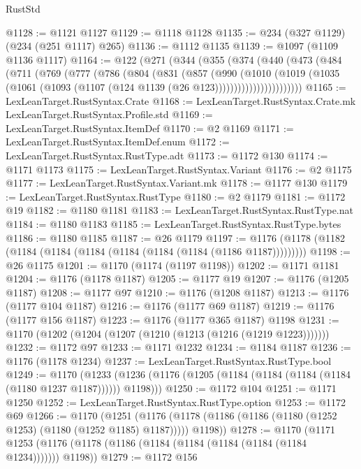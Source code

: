 \begin{lexlean}{RustStd}
\begin{coremodule}
@1128 := @1121 @1127
@1129 := @1118 @1128
@1135 := @234 (@327 @1129) (@234 (@251 @1117) @265)
@1136 := @1112 @1135
@1139 := @1097 (@1109 @1136 @1117)
@1164 := @122
    (@271
      (@344
        (@355
          (@374
            (@440
              (@473
                (@484
                  (@711
                    (@769
                      (@777
                        (@786
                          (@804
                            (@831
                              (@857
                                (@990
                                  (@1010
                                    (@1019
                                      (@1035
                                        (@1061
                                          (@1093 (@1107 (@124 @1139 (@26 @123)))))))))))))))))))))))
@1165 := LexLeanTarget.RustSyntax.Crate
@1168 := LexLeanTarget.RustSyntax.Crate.mk LexLeanTarget.RustSyntax.Profile.std
@1169 := LexLeanTarget.RustSyntax.ItemDef
@1170 := @2 @1169
@1171 := LexLeanTarget.RustSyntax.ItemDef.enum
@1172 := LexLeanTarget.RustSyntax.RustType.adt
@1173 := @1172 @130
@1174 := @1171 @1173
@1175 := LexLeanTarget.RustSyntax.Variant
@1176 := @2 @1175
@1177 := LexLeanTarget.RustSyntax.Variant.mk
@1178 := @1177 @130
@1179 := LexLeanTarget.RustSyntax.RustType
@1180 := @2 @1179
@1181 := @1172 @19
@1182 := @1180 @1181
@1183 := LexLeanTarget.RustSyntax.RustType.nat
@1184 := @1180 @1183
@1185 := LexLeanTarget.RustSyntax.RustType.bytes
@1186 := @1180 @1185
@1187 := @26 @1179
@1197 := @1176 (@1178 (@1182 (@1184 (@1184 (@1184 (@1184 (@1184 (@1184 (@1186 @1187)))))))))
@1198 := @26 @1175
@1201 := @1170 (@1174 (@1197 @1198))
@1202 := @1171 @1181
@1204 := @1176 (@1178 @1187)
@1205 := @1177 @19
@1207 := @1176 (@1205 @1187)
@1208 := @1177 @97
@1210 := @1176 (@1208 @1187)
@1213 := @1176 (@1177 @104 @1187)
@1216 := @1176 (@1177 @69 @1187)
@1219 := @1176 (@1177 @156 @1187)
@1223 := @1176 (@1177 @365 @1187) @1198
@1231 := @1170 (@1202 (@1204 (@1207 (@1210 (@1213 (@1216 (@1219 @1223)))))))
@1232 := @1172 @97
@1233 := @1171 @1232
@1234 := @1184 @1187
@1236 := @1176 (@1178 @1234)
@1237 := LexLeanTarget.RustSyntax.RustType.bool
@1249 := @1170
    (@1233 (@1236 (@1176 (@1205 (@1184 (@1184 (@1184 (@1184 (@1180 @1237 @1187)))))) @1198)))
@1250 := @1172 @104
@1251 := @1171 @1250
@1252 := LexLeanTarget.RustSyntax.RustType.option
@1253 := @1172 @69
@1266 := @1170
    (@1251 (@1176 (@1178 (@1186 (@1186 (@1180 (@1252 @1253) (@1180 (@1252 @1185) @1187))))) @1198))
@1278 := @1170
    (@1171 @1253 (@1176 (@1178 (@1186 (@1184 (@1184 (@1184 (@1184 (@1184 @1234))))))) @1198))
@1279 := @1172 @156

\end{coremodule}
\end{lexlean}

